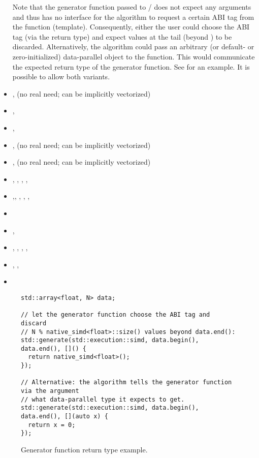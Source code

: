 \begin{itemize}
    Note that the generator function passed to / does not expect any arguments and thus has no interface for the algorithm to request a certain ABI tag from the function (template).
    Consequently, either the user could choose the ABI tag (via the return type) and expect values at the tail (beyond ) to be discarded.
    Alternatively, the algorithm could pass an arbitrary (or default- or zero-initialized) data-parallel object to the function.
    This would communicate the expected return type of the generator function.
    See  for an example.
    It is possible to allow both variants.
  \item {},  (no real need; can be implicitly vectorized)
  \item {}, 
  \item {}, 
  \item {},  (no real need; can be implicitly vectorized)
  \item {},  (no real need; can be implicitly vectorized)
  \item {}, , , , 
  \item {},, , , , 
  \item {}
  \item {}, 
  \item {}, , , , 
  \item {}, , 
  \item {}
\end{itemize}

\begin{figure}[bt]
\begin{lstlisting}
std::array<float, N> data;

// let the generator function choose the ABI tag and discard
// N % native_simd<float>::size() values beyond data.end():
std::generate(std::execution::simd, data.begin(), data.end(), []() {
  return native_simd<float>();
});

// Alternative: the algorithm tells the generator function via the argument
// what data-parallel type it expects to get.
std::generate(std::execution::simd, data.begin(), data.end(), [](auto x) {
  return x = 0;
});
\end{lstlisting}
  \caption{Generator function return type example.}
  \label{fig:generate example}
\end{figure}


